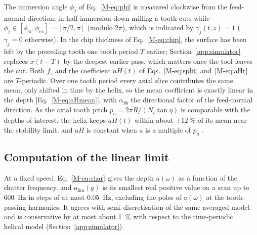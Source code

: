 The immersion angle $\phi_j$ of Eq.~\eqref{M-eq:phi} is measured clockwise from the feed-normal direction; in half-immersion down milling a tooth cuts while $\phi_j\in[\phi_{\mathrm{st}},\phi_{\mathrm{ex}}]=[\pi/2,\pi]$ (modulo $2\pi$), which is indicated by $\gamma_j(t,z)=1$ ($\gamma_j=0$ otherwise). In the chip thickness of Eq.~\eqref{M-eq:chip}, the surface has been left by the preceding tooth one tooth period $T$ earlier; Section~\ref{app:simulator} replaces $x(t-T)$ by the deepest earlier pass, which matters once the tool leaves the cut. Both $f_s$ and the coefficient $aH(t)$ of Eqs.~\eqref{M-eq:split} and~\eqref{M-eq:aHt} are $T$-periodic. Over one tooth period every axial slice contributes the same mean, only shifted in time by the helix, so the mean coefficient is exactly linear in the depth \citep{altintas1995analytical} [Eq.~\eqref{M-eq:aHmean}], with $\alpha_{yy}$ the directional factor of the feed-normal direction. As the axial tooth pitch $p_a=2\pi R/(N_t\tan\eta)$ is comparable with the depths of interest, the helix keeps $aH(t)$ within about $\pm\SI{12}{\percent}$ of its mean near the stability limit, and $aH$ is constant when $a$ is a multiple of $p_a$ \citep{zatarain2006helix,insperger2006helix}.

\subsection{Computation of the linear limit}\label{supp:std-model-zoa}

At a fixed speed, Eq.~\eqref{M-eq:char} gives the depth $a(\omega)$ as a function of the chatter frequency, and $a_{\lim}(g)$ is its smallest real positive value on a scan up to \SI{600}{\hertz} in steps of at most \SI{0.05}{\hertz}, excluding the poles of $a(\omega)$ at the tooth-passing harmonics. It agrees with semi-discretisation of the same averaged model and is conservative by at most about \SI{1}{\percent} with respect to the time-periodic helical model (Section~\ref{app:simulator}).


